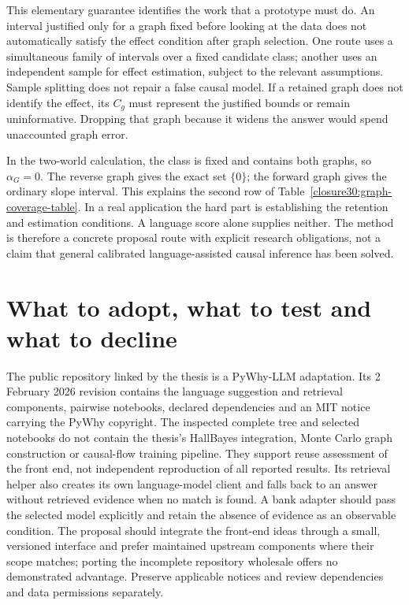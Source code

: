 This elementary guarantee identifies the work that a prototype must do.
An interval justified only for a graph fixed before looking at the data
does not automatically satisfy the effect condition after graph selection.
One route uses a simultaneous family of intervals over a fixed candidate
class; another uses an independent sample for effect estimation, subject to
the relevant assumptions. Sample splitting does not repair a false causal
model. If a retained graph does not identify the effect, its $C_g$ must
represent the justified bounds or remain uninformative. Dropping that graph
because it widens the answer would spend unaccounted graph error.

In the two-world calculation, the class is fixed and contains both graphs,
so $\alpha_G=0$. The reverse graph gives the exact set $\{0\}$; the forward
graph gives the ordinary slope interval. This explains the second row of
Table~\ref{closure30:graph-coverage-table}. In a real application the hard
part is establishing the retention and estimation conditions. A language
score alone supplies neither. The method is therefore a concrete proposal
route with explicit research obligations, not a claim that general calibrated
language-assisted causal inference has been solved.

\section{What to adopt, what to test and what to decline}

The public repository linked by the thesis is a PyWhy-LLM adaptation. Its
2 February 2026 revision contains the language suggestion and retrieval
components, pairwise notebooks, declared dependencies and an MIT notice
carrying the PyWhy copyright. The inspected complete tree and selected
notebooks do not contain the thesis's HallBayes integration, Monte Carlo
graph construction or causal-flow training pipeline. They support reuse
assessment of the front end, not independent reproduction of all reported
results. Its retrieval helper also creates its own language-model client and
falls back to an answer without retrieved evidence when no match is found.
A bank adapter should pass the selected model explicitly and retain the
absence of evidence as an observable condition. The proposal should
integrate the front-end ideas through a small,
versioned interface and prefer maintained upstream components where their
scope matches; porting the incomplete repository wholesale offers no
demonstrated advantage. Preserve applicable notices and review dependencies
and data permissions separately.
\citep{closure30molerocode}

